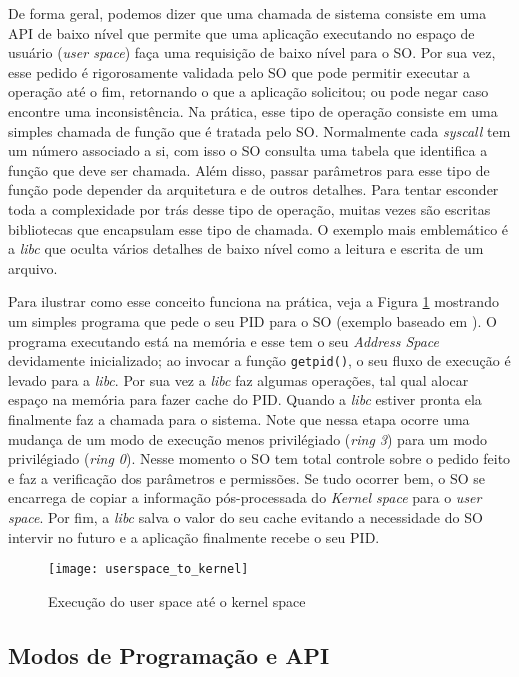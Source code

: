 De forma geral, podemos dizer que uma chamada de sistema consiste em uma API de
baixo nível que permite que uma aplicação executando no espaço de usuário
(\emph{user space}) faça uma requisição de baixo nível para o SO. Por sua vez,
esse pedido é rigorosamente validada pelo SO que pode permitir executar a
operação até o fim, retornando o que a aplicação solicitou; ou pode negar caso
encontre uma inconsistência. Na prática, esse tipo de operação consiste em uma
simples chamada de função que é tratada pelo SO. Normalmente cada
\emph{syscall} tem um número associado a si, com isso o SO consulta uma tabela
que identifica a função que deve ser chamada. Além disso, passar parâmetros
para esse tipo de função pode depender da arquitetura e de outros detalhes.
Para tentar esconder toda a complexidade por trás desse tipo de operação,
muitas vezes são escritas bibliotecas que encapsulam esse tipo de chamada. O
exemplo mais emblemático é a \emph{libc} que oculta vários detalhes de baixo
nível como a leitura e escrita de um arquivo.

Para ilustrar como esse conceito funciona na prática, veja a Figura
\ref{fig:userspace_kernelspace} mostrando um simples programa que pede o seu
PID para o SO (exemplo baseado em \cite{syscallex}). O programa executando está
na memória e esse tem o seu \emph{Address Space} devidamente inicializado; ao
invocar a função \texttt{getpid()}, o seu fluxo de execução é levado para a
\emph{libc}. Por sua vez a \emph{libc} faz algumas operações, tal qual alocar
espaço na memória para fazer cache do PID. Quando a \emph{libc} estiver pronta
ela finalmente faz a chamada para o sistema. Note que nessa etapa ocorre uma
mudança de um modo de execução menos privilégiado (\emph{ring 3}) para um modo
privilégiado (\emph{ring 0}). Nesse momento o SO tem total controle sobre o
pedido feito e faz a verificação dos parâmetros e permissões. Se tudo ocorrer
bem, o SO se encarrega de copiar a informação pós-processada do \emph{Kernel
space} para o \emph{user space}. Por fim, a \emph{libc} salva o valor do seu
cache evitando a necessidade do SO intervir no futuro e a aplicação finalmente
recebe o seu PID.

\begin{figure}[!h]
  \centering
  \texttt{[image: userspace\_to\_kernel]} 
  \caption{Execução do user space até o kernel space}
  \label{fig:userspace_kernelspace}
\end{figure}

\subsection{Modos de Programação e API}

